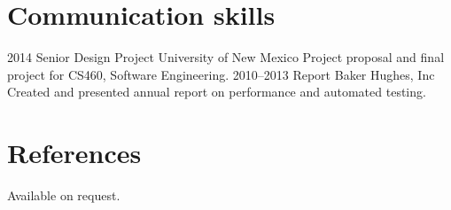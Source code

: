 \documentclass[]{friggeri-cv} %
\begin{document}

\section{Communication skills}

\begin{entrylist}
\entry
{2014}
{Senior Design Project}
{University of New Mexico}
{Project proposal and final project for CS460, Software Engineering.}
\entry
{2010--2013}
{Report}
{Baker Hughes, Inc}
{Created and presented annual report on performance and automated testing.}
 \end{entrylist}


\section{References}

Available on request.
\end{document}
